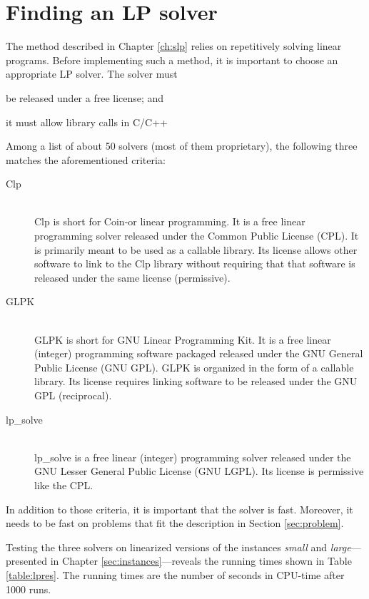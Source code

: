 \section{Finding an LP solver}
The method described in Chapter \ref{ch:slp} relies on repetitively solving
linear programs. Before implementing such a method, it is important to choose
an appropriate LP solver. The solver must
\begin{inparaenum}
\item be released under a free license; and
\item it must allow library calls in C/C++
\end{inparaenum}

Among a list of about 50 solvers (most of them proprietary), the
following three matches the aforementioned criteria:
\begin{description}
\item[Clp] \hfill \\
Clp is short for Coin-or linear programming. It is a free linear programming
solver released under the Common Public License (CPL). It is primarily meant to
be used as a callable library. Its license allows other software to link to the
Clp library without requiring that that software is released under the same
license (permissive). \cite{clp}
\item[GLPK] \hfill \\
GLPK is short for GNU Linear Programming Kit. It is a free linear (integer)
programming software packaged released under the GNU General Public License
(GNU GPL). GLPK is organized in the form of a callable library. Its license
requires linking software to be released under the GNU GPL (reciprocal).
\cite{glpk}
\item[lp\_solve] \hfill \\
lp\_solve is a free linear (integer) programming solver released under the GNU 
Lesser General Public License (GNU LGPL). Its license is permissive like the
CPL. \cite{lpsolve}
\end{description}

In addition to those criteria, it is important that the solver is fast.
Moreover, it needs to be fast on problems that fit the description in
Section \ref{sec:problem}.

Testing the three solvers on linearized versions of the instances
\textit{small} and \textit{large}---presented in
Chapter \ref{sec:instances}---reveals the running times shown in Table
\ref{table:lpres}.
The running times are the number of seconds in CPU-time after 1000 runs.

